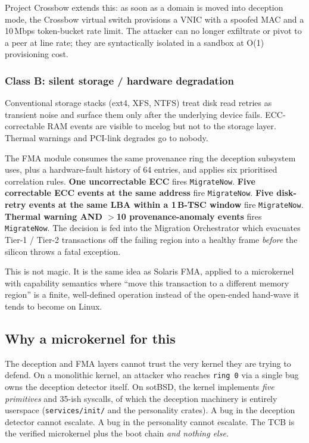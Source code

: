 \documentclass[11pt,a4paper]{article}
\begin{document}
Project Crossbow extends this: as soon as a domain is moved into
deception mode, the Crossbow virtual switch provisions a VNIC with a
spoofed MAC and a 10\,Mbps token-bucket rate limit. The attacker can
no longer exfiltrate or pivot to a peer at line rate; they are
syntactically isolated in a sandbox at O(1) provisioning cost.

\subsubsection*{Class B: silent storage / hardware degradation}

Conventional storage stacks (ext4, XFS, NTFS) treat disk read retries
as transient noise and surface them only after the underlying device
fails. ECC-correctable RAM events are visible to mcelog but not to the
storage layer. Thermal warnings and PCI-link degrades go to nobody.

The FMA module consumes the same provenance ring the deception
subsystem uses, plus a hardware-fault history of 64 entries, and
applies six prioritised correlation rules. \textbf{One uncorrectable
ECC} fires \texttt{MigrateNow}. \textbf{Five correctable ECC events at
the same address} fire \texttt{MigrateNow}. \textbf{Five disk-retry
events at the same LBA within a 1\,B-TSC window} fire
\texttt{MigrateNow}. \textbf{Thermal warning AND $>$10
provenance-anomaly events} fires \texttt{MigrateNow}. The decision is
fed into the Migration Orchestrator which evacuates Tier-1 / Tier-2
transactions off the failing region into a healthy frame
\emph{before} the silicon throws a fatal exception.

This is not magic. It is the same idea as Solaris FMA, applied to a
microkernel with capability semantics where ``move this transaction
to a different memory region'' is a finite, well-defined operation
instead of the open-ended hand-wave it tends to become on Linux.

\subsection{Why a microkernel for this}

The deception and FMA layers cannot trust the very kernel they are
trying to defend. On a monolithic kernel, an attacker who reaches
\texttt{ring~0} via a single bug owns the deception detector itself.
On sotBSD, the kernel implements \emph{five primitives} and 35-ish
syscalls, of which the deception machinery is entirely userspace
(\texttt{services/init/} and the personality crates). A bug in the
deception detector cannot escalate. A bug in the personality cannot
escalate. The TCB is the verified microkernel plus the boot chain
\emph{and nothing else}.
\end{document}
